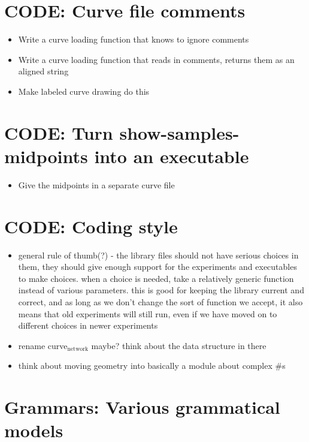 \documentclass{book}
\begin{document}
\section{CODE: Curve file comments}
\label{sec-5_3}

\begin{itemize}
\item Write a curve loading function that knows to ignore comments
\item Write a curve loading function that reads in comments, returns
    them as an aligned string
\item Make labeled curve drawing do this
\end{itemize}
\section{CODE: Turn show-samples-midpoints into an executable}
\label{sec-5_4}

\begin{itemize}
\item Give the midpoints in a separate curve file
\end{itemize}
\section{CODE: Coding style}
\label{sec-5_5}

\begin{itemize}
\item general rule of thumb(?) - the library files should not have
    serious choices in them, they should give enough support for the
    experiments and executables to make choices. when a choice is
    needed, take a relatively generic function instead of various
    parameters. this is good for keeping the library current and
    correct, and as long as we don't change the sort of function we
    accept, it also means that old experiments will still run, even if
    we have moved on to different choices in newer experiments
\item rename curve$_{\mathrm{network}}$ maybe? think about the data structure in there
\item think about moving geometry into basically a module about complex \#s
\end{itemize}
\section{Grammars: Various grammatical models}
\label{sec-5_6}
\end{document}
